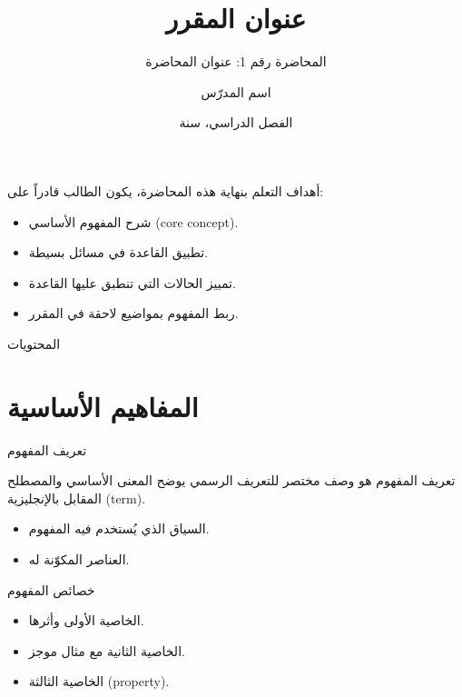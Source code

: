 \documentclass[aspectratio=169,11pt]{beamer}
\title{عنوان المقرر}
\subtitle{المحاضرة رقم 1: عنوان المحاضرة}
\author{اسم المدرّس}
\institute{الجامعة}
\date{الفصل الدراسي، سنة}
\let\textEN\textenglish
\begin{document}
\begin{frame}[plain]
\titlepage
\end{frame}

\begin{frame}{أهداف التعلم}
بنهاية هذه المحاضرة، يكون الطالب قادراً على:
\begin{itemize}
  \item شرح المفهوم الأساسي \textEN{(core concept)}.
  \item تطبيق القاعدة في مسائل بسيطة.
  \item تمييز الحالات التي تنطبق عليها القاعدة.
  \item ربط المفهوم بمواضيع لاحقة في المقرر.
\end{itemize}
\end{frame}

\begin{frame}{المحتويات}
\tableofcontents
\end{frame}

\section{المفاهيم الأساسية}

\begin{frame}{تعريف المفهوم}
\begin{block}{تعريف}
المفهوم هو وصف مختصر للتعريف الرسمي يوضح المعنى الأساسي
والمصطلح المقابل بالإنجليزية \textEN{(term)}.
\end{block}

\begin{itemize}
  \item السياق الذي يُستخدم فيه المفهوم.
  \item العناصر المكوّنة له.
\end{itemize}
\end{frame}

\begin{frame}{خصائص المفهوم}
\begin{itemize}
  \item الخاصية الأولى وأثرها.
  \item الخاصية الثانية مع مثال موجز.
  \item الخاصية الثالثة \textEN{(property)}.
\end{itemize}
\end{frame}
\end{document}
